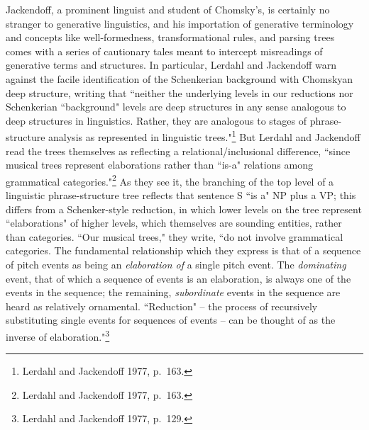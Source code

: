 Jackendoff, a prominent linguist and student of Chomsky's, is certainly no stranger to generative linguistics, and his importation of generative terminology and concepts like well-formedness, transformational rules, and parsing trees comes with a series of cautionary tales meant to intercept misreadings of generative terms and structures.  In particular, Lerdahl and Jackendoff warn against the facile identification of the Schenkerian background with Chomskyan deep structure, writing that ``neither the underlying levels in our reductions nor Schenkerian ``background" levels are deep structures in any sense analogous to deep structures in linguistics.  Rather, they are analogous to stages of phrase-structure analysis as represented in linguistic trees."\footnote{Lerdahl and Jackendoff 1977, p.\ 163.}  But Lerdahl and Jackendoff read the trees themselves as reflecting a relational/inclusional difference, ``since musical trees represent elaborations rather than ``is-a" relations among grammatical categories."\footnote{Lerdahl and Jackendoff 1977, p.\ 163.}  As they see it, the branching of the top level of a linguistic phrase-structure tree reflects that sentence S ``is a" NP plus a VP; this differs from a Schenker-style reduction, in which lower levels on the tree represent ``elaborations" of higher levels, which themselves are sounding entities, rather than categories.  ``Our musical trees," they write, ``do not involve grammatical categories.  The fundamental relationship which they express is that of a sequence of pitch events as being an \emph{elaboration of} a single pitch event.  The \emph{dominating} event, that of which a sequence of events is an elaboration, is always one of the events in the sequence; the remaining, \emph{subordinate} events in the sequence are heard as relatively ornamental.  ``Reduction" -- the process of recursively substituting single events for sequences of events -- can be thought of as the inverse of elaboration."\footnote{Lerdahl and Jackendoff 1977, p.\ 129.}

